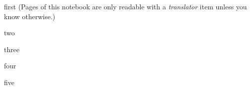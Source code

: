 \documentclass[notebook]{Silversiders} %
\begin{document}
\startnotebook{\nHypnosisResearch{}}

\begin{page}{first}
(Pages of this notebook are only readable with a \emph{translator} item unless you know otherwise.)
\end{page}

\begin{page}{two}

\end{page}

\begin{page}{three}

\end{page}

\begin{page}{four}

\end{page}

\begin{page}{five}

\end{page}

\endnotebook
\end{document}
